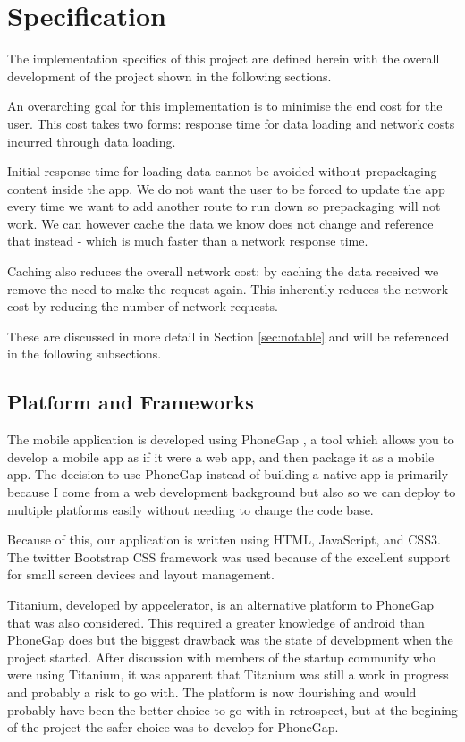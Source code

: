 \section{Specification}
\label{sec:specification}
The implementation specifics of this project are defined herein with
the overall development of the project shown in the following sections.

An overarching goal for this implementation is to minimise the end cost
for the user. This cost takes two forms: response time for data
loading and network costs incurred through data loading.

Initial response time for loading data cannot be avoided without
prepackaging content inside the app. We do not want the user to be
forced to update the app every time we want to add another route to
run down so prepackaging will not work. We can however cache the data
we know does not change and reference that instead - which is much
faster than a network response time.

Caching also reduces the overall network cost: by caching the data
received we remove the need to make the request again. This inherently
reduces the network cost by reducing the number of network requests.

These are discussed in more detail in Section \ref{sec:notable} and
will be referenced in the following subsections.

\subsection{Platform and Frameworks}
The mobile application is developed using PhoneGap \cite{phonegap}, 
a tool which allows you to develop a mobile app as if it were
a web app, and then package it as a mobile app. The decision to use
PhoneGap instead of building a native app is primarily because I come
from a web development background but also so we can deploy to
multiple platforms easily without needing to change the code base. 

Because of this, our application is written using HTML, JavaScript,
and CSS3. The twitter Bootstrap CSS framework \cite{bootstrap} was
used because of the excellent support for small screen devices and
layout management. 

Titanium, developed by appcelerator\cite{titanium}, is an alternative
platform to PhoneGap that was also considered. This required a greater
knowledge of android than PhoneGap does but the biggest drawback was
the state of development when the project started. After discussion
with members of the startup community who were using Titanium, it was
apparent that Titanium was still a work in progress and probably a
risk to go with. The platform is now flourishing and would probably
have been the better choice to go with in retrospect, but at the
begining of the project the safer choice was to develop for PhoneGap.

